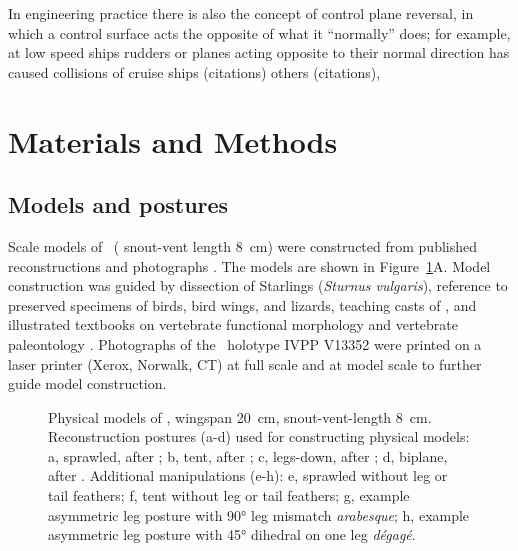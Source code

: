 In engineering practice there is also the concept of control plane reversal, in which a control surface acts the opposite of what it ``normally'' does; for example, at low speed ships rudders or planes acting opposite to their normal direction has caused collisions of cruise ships (citations) others (citations), 





\section{Materials and Methods}

\subsection{Models and postures}
Scale models of \Mgui\ (%
snout-vent length \SI{8}{\centi\meter}) were constructed from published reconstructions and photographs \citep{Xu:2003, Chatterjee:2007, Nova}.  The models are shown in Figure~\ref{fig:model}A.  Model construction was guided by dissection of Starlings (\emph{Sturnus vulgaris}), reference to preserved specimens of birds, bird wings, and lizards, teaching casts of \Archaeopteryx, and illustrated textbooks on vertebrate functional morphology and vertebrate paleontology \citep{Liem:2000, Benton:1997}.  Photographs of the \Mgui\ holotype IVPP V13352 were printed on a laser printer (Xerox, Norwalk, CT) at full scale and at model scale to further guide model construction.  %
\begin{figure}
\caption{%
{ Physical models of \Mgui, wingspan \SI{20}{\centi\meter}, snout-vent-length \SI{8}{\centi\meter}.}  Reconstruction postures (a-d) used for constructing physical models:  a, sprawled, after \citep{Xu:2003};  b, tent, after \citep{Nova}; c, legs-down, after \citep{Nova};  d, biplane, after \citep{Chatterjee:2007}. Additional manipulations (e-h): e, sprawled without leg or tail feathers; f, tent without leg or tail feathers; g, example asymmetric leg posture with \ang{90} leg mismatch \emph{arabesque}; h, example asymmetric leg posture with \ang{45} dihedral on one leg \emph{d{\'e}gag{\'e}}.%
}
\label{fig:model}
\end{figure}

